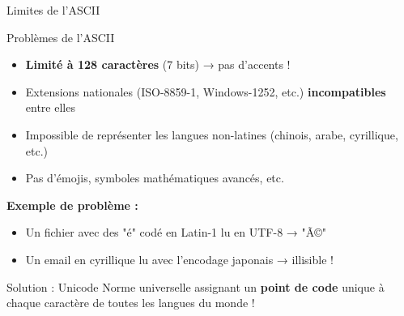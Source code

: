 \documentclass[aspectratio=1610]{beamer}
\begin{document}
\begin{frame}{Limites de l'ASCII}

  \begin{alertblock}{ Problèmes de l'ASCII}
    \begin{itemize}
      \item \textbf{Limité à 128 caractères} (7 bits) → pas d'accents !
      \item Extensions nationales (ISO-8859-1, Windows-1252, etc.) \textbf{incompatibles} entre elles
      \item Impossible de représenter les langues non-latines (chinois, arabe, cyrillique, etc.)
      \item Pas d'émojis, symboles mathématiques avancés, etc.
    \end{itemize}
  \end{alertblock}

  \vspace{0.3cm}

  \textbf{Exemple de problème :}

  \begin{itemize}
    \item Un fichier avec des "é" codé en Latin-1 lu en UTF-8 → "Ã©"
    \item Un email en cyrillique lu avec l'encodage japonais → illisible !
  \end{itemize}


  \begin{block}{Solution : Unicode}
    Norme universelle assignant un \textbf{point de code} unique à chaque caractère de toutes les langues du monde !
  \end{block}

\end{frame}
\end{document}
